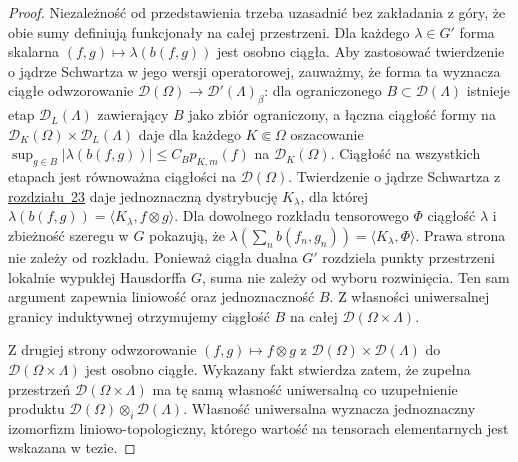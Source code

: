 \documentclass[11pt,a4paper]{article}
\numberwithin{equation}{section}
\theoremstyle{plain}
\theoremstyle{definition}
\theoremstyle{remark}
\begin{document}
\begin{proof}
Niezależność od przedstawienia trzeba uzasadnić bez
zakładania z góry, że obie sumy definiują funkcjonały
na całej przestrzeni. Dla każdego $\lambda\in G'$ forma
skalarna $(f,g)\mapsto\lambda(b(f,g))$ jest osobno ciągła.
Aby zastosować twierdzenie o jądrze Schwartza w jego
wersji operatorowej, zauważmy, że forma ta wyznacza
ciągłe odwzorowanie $\mathcal D(\Omega)\to
\mathcal D'(\Lambda)_\beta$: dla ograniczonego
$B\subset\mathcal D(\Lambda)$ istnieje etap
$\mathcal D_L(\Lambda)$ zawierający $B$ jako zbiór
ograniczony, a łączna ciągłość formy na
$\mathcal D_K(\Omega)\times\mathcal D_L(\Lambda)$
daje dla każdego $K\Subset\Omega$ oszacowanie
$\sup_{g\in B}|\lambda(b(f,g))|\le C_B p_{K,m}(f)$
na $\mathcal D_K(\Omega)$. Ciągłość na wszystkich
etapach jest równoważna ciągłości na $\mathcal D(\Omega)$.
Twierdzenie o jądrze Schwartza z \hyperref[sec:montel-nuklearne23]{rozdziału~23} daje
jednoznaczną dystrybucję $K_\lambda$, dla której
$\lambda(b(f,g))=\langle K_\lambda,f\otimes g\rangle$.
Dla dowolnego rozkładu tensorowego $\Phi$ ciągłość
$\lambda$ i zbieżność szeregu w $G$ pokazują, że
$\lambda(\sum_n b(f_n,g_n))=\langle K_\lambda,\Phi\rangle$.
Prawa strona nie zależy od rozkładu. Ponieważ ciągła
dualna $G'$ rozdziela punkty przestrzeni lokalnie
wypukłej Hausdorffa $G$, suma nie zależy od wyboru
rozwinięcia. Ten sam argument zapewnia liniowość
oraz jednoznaczność $B$.
Z własności uniwersalnej granicy induktywnej otrzymujemy
ciągłość $B$ na całej $\mathcal D(\Omega\times\Lambda)$.

Z drugiej strony odwzorowanie $(f,g)\mapsto f\otimes g$
z $\mathcal D(\Omega)\times\mathcal D(\Lambda)$ do
$\mathcal D(\Omega\times\Lambda)$ jest osobno ciągłe.
Wykazany fakt stwierdza zatem, że zupełna przestrzeń
$\mathcal D(\Omega\times\Lambda)$ ma tę samą własność
uniwersalną co uzupełnienie produktu
$\mathcal D(\Omega)\otimes_i\mathcal D(\Lambda)$.
Własność uniwersalna wyznacza jednoznaczny izomorfizm
liniowo-topologiczny, którego wartość na tensorach
elementarnych jest wskazana w tezie.
\end{proof}
\end{document}
